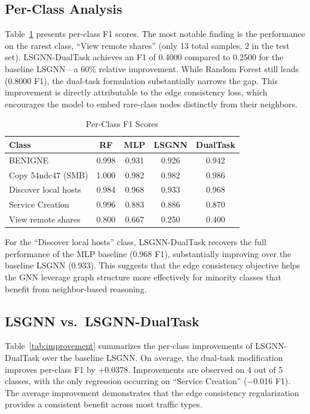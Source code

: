 \documentclass[conference]{IEEEtran}
\begin{document}
\subsection{Per-Class Analysis}

Table~\ref{tab:perclass} presents per-class F1 scores. The most notable finding is the performance on the rarest class, ``View remote shares'' (only 13 total samples, 2 in the test set). LSGNN-DualTask achieves an F1 of 0.4000 compared to 0.2500 for the baseline LSGNN---a 60\% relative improvement. While Random Forest still leads (0.8000 F1), the dual-task formulation substantially narrows the gap. This improvement is directly attributable to the edge consistency loss, which encourages the model to embed rare-class nodes distinctly from their neighbors.

\begin{table}[t]
\centering
\caption{Per-Class F1 Scores}
\label{tab:perclass}
\begin{tabular}{@{}lcccc@{}}
\toprule
\textbf{Class} & \textbf{RF} & \textbf{MLP} & \textbf{LSGNN} & \textbf{DualTask} \\
\midrule
BENIGNE              & 0.998 & 0.931 & 0.926 & 0.942 \\
Copy 54ndc47 (SMB)   & 1.000 & 0.982 & 0.982 & 0.986 \\
Discover local hosts & 0.984 & 0.968 & 0.933 & 0.968 \\
Service Creation     & 0.996 & 0.883 & 0.886 & 0.870 \\
View remote shares   & 0.800 & 0.667 & 0.250 & 0.400 \\
\bottomrule
\end{tabular}
\end{table}

For the ``Discover local hosts'' class, LSGNN-DualTask recovers the full performance of the MLP baseline (0.968 F1), substantially improving over the baseline LSGNN (0.933). This suggests that the edge consistency objective helps the GNN leverage graph structure more effectively for minority classes that benefit from neighbor-based reasoning.

\subsection{LSGNN vs.\ LSGNN-DualTask}

Table~\ref{tab:improvement} summarizes the per-class improvements of LSGNN-DualTask over the baseline LSGNN. On average, the dual-task modification improves per-class F1 by +0.0378. Improvements are observed on 4 out of 5 classes, with the only regression occurring on ``Service Creation'' ($-$0.016 F1). The average improvement demonstrates that the edge consistency regularization provides a consistent benefit across most traffic types.
\end{document}
